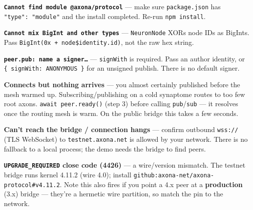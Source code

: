 \documentclass[
  nobib]{tufte-handout}
\begin{document}
\textbf{\texttt{Cannot\ find\ module\ \textquotesingle{}@axona/protocol\textquotesingle{}}}
--- make sure \texttt{package.json} has \texttt{"type":\ "module"} and
the install completed. Re-run \texttt{npm\ install}.

\textbf{\texttt{Cannot\ mix\ BigInt\ and\ other\ types}} ---
\texttt{NeuronNode} XORs node IDs as BigInts. Pass
\texttt{BigInt(\textquotesingle{}0x\textquotesingle{}\ +\ node\$identity.id)},
not the raw hex string.

\textbf{\texttt{peer.pub:\ name\ a\ signer…}} --- \texttt{signWith} is
required. Pass an author identity, or
\texttt{\{\ signWith:\ ANONYMOUS\ \}} for an unsigned publish. There is
no default signer.

\textbf{Connects but nothing arrives} --- you almost certainly published
before the mesh warmed up. Subscribing/publishing on a cold synaptome
routes to too few root axons. \texttt{await\ peer.ready()} (step 3)
before calling \texttt{pub}/\texttt{sub} --- it resolves once the
routing mesh is warm. On the public bridge this takes a few seconds.

\textbf{Can't reach the bridge / connection hangs} --- confirm outbound
\texttt{wss://} (TLS WebSocket) to \texttt{testnet.axona.net} is allowed
by your network. There is no fallback to a local process; the demo needs
the bridge to find peers.

\textbf{\texttt{UPGRADE\_REQUIRED} close code (4426)} --- a wire/version
mismatch. The testnet bridge runs kernel 4.11.2 (wire 4.0); install
\texttt{github:axona-net/axona-protocol\#v4.11.2}. Note this also fires
if you point a 4.x peer at a \textbf{production} (3.x) bridge ---
they're a hermetic wire partition, so match the pin to the network.
\end{document}
